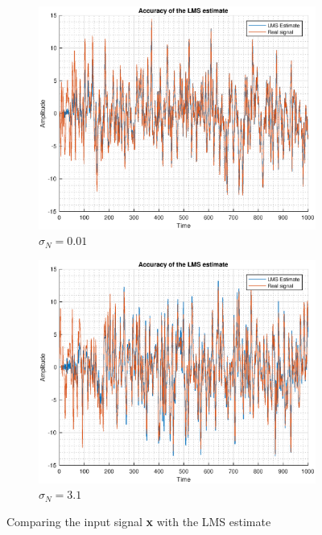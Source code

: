 \documentclass{article}
\begin{document}
\begin{figure}[h!]
\centering
\begin{subfigure}{0.33\textwidth}
\centering
\includegraphics[width = \textwidth]{lms_acc_1}
\caption{$\sigma_N=0.01$}
\label{fig:lms_acc_1}
\end{subfigure}
\begin{subfigure}{0.33\textwidth}
\centering
\includegraphics[width = \textwidth]{lms_acc_2}
\caption{$\sigma_N=3.1$}
\label{fig:lms_acc_2}
\end{subfigure}
\caption{\label{fig:lms_accuracy} Comparing the input signal \textbf{x} with the LMS estimate}
\end{figure}
\end{document}
